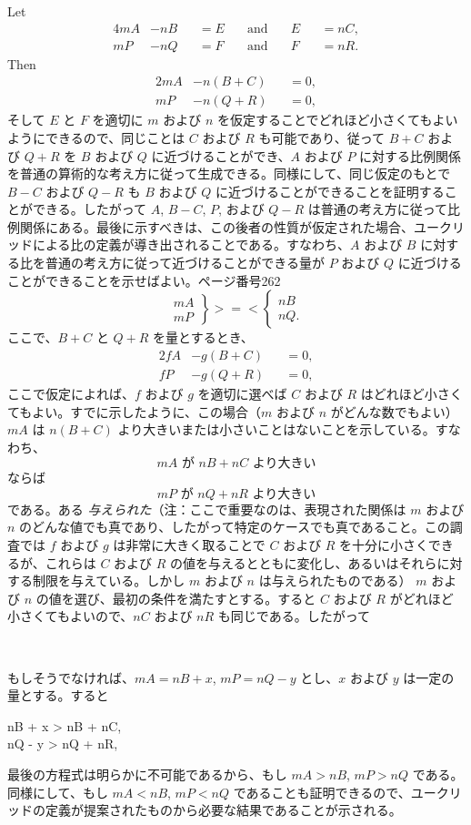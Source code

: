\documentclass[a4paper,11pt,openany]{ltjsbook}
\newcommand{\ds}{\displaystyle}
\newcommand{\GLT}[4]{\left.\begin{array}{l}\ds#1 \\ \ds #3\end{array}\right\} >=< \left\{\begin{array}{l}\ds#2 \\ \ds #4\end{array}\right.}
\begin{document}
Let
\begin{alignat*}{4}
mA &- nB &&= E \quad&\text{and}\quad& E &&= nC, \\
mP &- nQ &&= F      &\text{and}\quad& F &&= nR.
\end{alignat*}
Then
\begin{alignat*}{2}
mA &- n(B + C) &&= 0, \\
mP &- n(Q + R) &&= 0,
\end{alignat*}
そして $E$ と $F$ を適切に $m$ および $n$ を仮定することでどれほど小さくてもよいようにできるので、同じことは $C$ および $R$ も可能であり、従って $B + C$ および $Q + R$ を $B$ および $Q$ に近づけることができ、$A$ および $P$ に対する比例関係を普通の算術的な考え方に従って生成できる。同様にして、同じ仮定のもとで $B - C$ および $Q - R$ も $B$ および $Q$ に近づけることができることを証明することができる。したがって $A$, $B - C$, $P$, および $Q - R$ は普通の考え方に従って比例関係にある。最後に示すべきは、この後者の性質が仮定された場合、ユークリッドによる比の定義が導き出されることである。すなわち、$A$ および $B$ に対する比を普通の考え方に従って近づけることができる量が $P$ および $Q$ に近づけることができることを示せばよい。ページ番号262
\[
\GLT{mA}{nB}{mP}{nQ.}
\]
ここで、$B + C$ と $Q + R$ を量とするとき、
\begin{alignat*}{2}
fA &- g(B + C) &&= 0, \\
fP &- g(Q + R) &&= 0,
\end{alignat*}
ここで仮定によれば、$f$ および $g$ を適切に選べば $C$ および $R$ はどれほど小さくてもよい。すでに示したように、この場合（$m$ および $n$ がどんな数でもよい）$mA$ は $n(B + C)$ より大きいまたは小さいことはないことを示している。すなわち、
\[
\text{$mA$ が $nB + nC$ より大きい}
\]
ならば
\[
\text{$mP$ が $nQ + nR$ より大きい}
\]
である。ある \emph{与えられた}（注：ここで重要なのは、表現された関係は $m$ および $n$ のどんな値でも真であり、したがって特定のケースでも真であること。この調査では $f$ および $g$ は非常に大きく取ることで $C$ および $R$ を十分に小さくできるが、これらは $C$ および $R$ の値を与えるとともに変化し、あるいはそれらに対する制限を与えている。しかし $m$ および $n$ は与えられたものである）
$m$ および $n$ の値を選び、最初の条件を満たすとする。すると $C$ および $R$ がどれほど小さくてもよいので、$nC$ および $nR$ も同じである。したがって
\begin{center}
 \\
\end{center}
もしそうでなければ、$mA = nB + x$, $mP = nQ - y$ とし、$x$ および $y$ は一定の量とする。すると
\begin{center}
nB + x > nB + nC, \\
nQ - y > nQ + nR,
\end{center}
最後の方程式は明らかに不可能であるから、もし $mA > nB$, $mP > nQ$ である。同様にして、もし $mA < nB$, $mP < nQ$ であることも証明できるので、ユークリッドの定義が提案されたものから必要な結果であることが示される。
\end{document}

